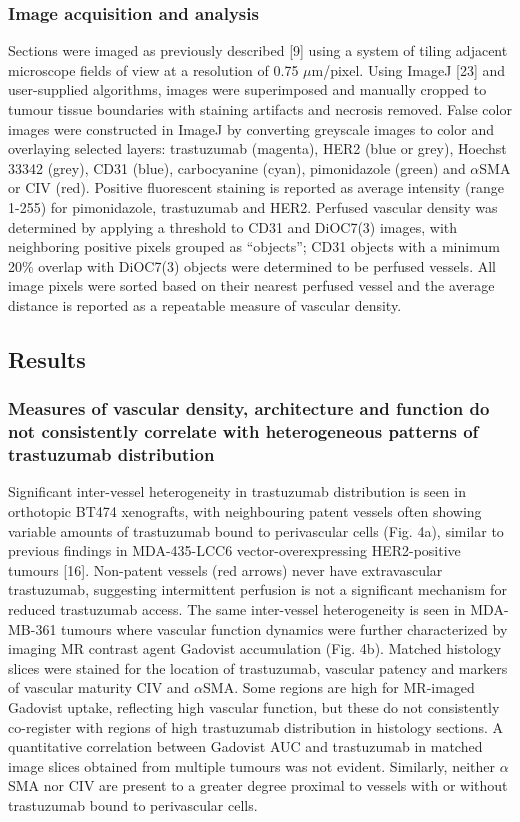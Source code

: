 \subsubsection{Image acquisition and analysis}
Sections were imaged as previously described [9] using a system of tiling adjacent microscope fields of view at a resolution of 0.75 $\mu$m/pixel.
Using ImageJ [23] and user-supplied algorithms, images were superimposed and manually cropped to tumour tissue boundaries with staining artifacts and necrosis removed.
False color images were constructed in ImageJ by converting greyscale images to color and overlaying selected layers: trastuzumab (magenta), HER2 (blue or grey), Hoechst 33342 (grey), CD31 (blue), carbocyanine (cyan), pimonidazole (green) and $\alpha$SMA or CIV (red).
Positive fluorescent staining is reported as average intensity (range 1-255) for pimonidazole, trastuzumab and HER2.
Perfused vascular density was determined by applying a threshold to CD31 and DiOC7(3) images, with neighboring positive pixels grouped as ``objects''; CD31 objects with a minimum 20\% overlap with DiOC7(3) objects were determined to be perfused vessels.
All image pixels were sorted based on their nearest perfused vessel and the average distance is reported as a repeatable measure of vascular density.

\subsection{Results}

\subsubsection{Measures of vascular density, architecture and function do not consistently correlate with heterogeneous patterns of trastuzumab distribution}

Significant inter-vessel heterogeneity in trastuzumab distribution is seen in orthotopic BT474 xenografts, with neighbouring patent vessels often showing variable amounts of trastuzumab bound to perivascular cells (Fig.
4a), similar to previous findings in MDA-435-LCC6 vector-overexpressing HER2-positive tumours [16].
Non-patent vessels (red arrows) never have extravascular trastuzumab, suggesting intermittent perfusion is not a significant mechanism for reduced trastuzumab access.
The same inter-vessel heterogeneity is seen in MDA-MB-361 tumours where vascular function dynamics were further characterized by imaging MR contrast agent Gadovist accumulation (Fig.
4b).
Matched histology slices were stained for the location of trastuzumab, vascular patency and markers of vascular maturity CIV and $\alpha$SMA.
Some regions are high for MR-imaged Gadovist uptake, reflecting high vascular function, but these do not consistently co-register with regions of high trastuzumab distribution in histology sections.
A quantitative correlation between Gadovist AUC and trastuzumab in matched image slices obtained from multiple tumours was not evident.
Similarly, neither $\alpha$SMA nor CIV are present to a greater degree proximal to vessels with or without trastuzumab bound to perivascular cells.

